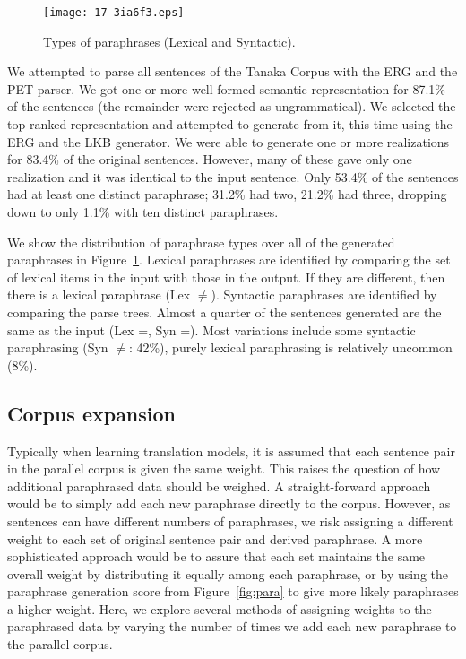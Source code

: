 \documentclass[english]{jnlp_1.4}
\begin{document}
\begin{figure}[t]
\begin{center}
\texttt{[image: 17-3ia6f3.eps]}
\end{center}
  \caption{Types of paraphrases (Lexical and Syntactic).}
  \label{fig:dist}
\end{figure}


We attempted to parse all sentences of the Tanaka Corpus with the ERG
and the PET parser.  We got one or more well-formed semantic
representation for 87.1\% of the sentences (the remainder were
rejected as ungrammatical).  We selected the top ranked representation
and attempted to generate from it, this time using the ERG and the LKB
generator.  We were able to generate one or more realizations for
83.4\% of the original sentences.  However, many of these gave only
one realization and it was identical to the input sentence. Only
53.4\% of the sentences had at least one distinct paraphrase; 31.2\%
had two, 21.2\% had three, dropping down to only 1.1\% with ten
distinct paraphrases.

We show the distribution of paraphrase types over all of the generated
paraphrases in Figure~\ref{fig:dist}.  Lexical paraphrases are
identified by comparing the set of lexical items in the input with
those in the output. If they are different, then there is a lexical
paraphrase (Lex $\ne$). Syntactic paraphrases are identified by
comparing the parse trees. Almost a quarter of the sentences generated
are the same as the input (Lex =, Syn =). Most variations include some
syntactic paraphrasing (Syn $\ne$: 42\%), purely lexical paraphrasing
is relatively uncommon (8\%).



\subsection{Corpus expansion}
\label{sec:corpus-expansion}

Typically when learning translation models, it is assumed that each
sentence pair in the parallel corpus is given the same weight. This
raises the question of how additional paraphrased data should be
weighed. A straight-forward approach would be to simply add each new
paraphrase directly to the corpus. However, as sentences can have
different numbers of paraphrases, we risk assigning a different weight
to each set of original sentence pair and derived paraphrase. A more
sophisticated approach would be to assure that each set maintains the
same overall weight by distributing it equally among each paraphrase,
or by using the paraphrase generation score from Figure~\ref{fig:para}
to give more likely paraphrases a higher weight. Here, we explore
several methods of assigning weights to the paraphrased data by
varying the number of times we add each new paraphrase to the parallel
corpus.
\end{document}
